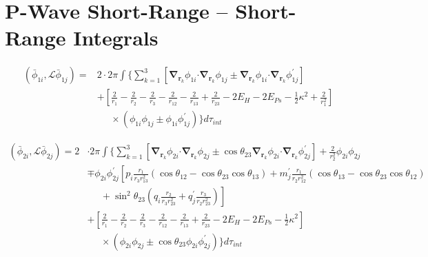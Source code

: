\documentclass[Dissertation.tex]{subfiles}
\begin{document}
\section{P-Wave Short-Range -- Short-Range Integrals}
\label{sec:PWaveShortShort}

\begin{align}
\label{eq:PWavePhi1Phi1}
\left(\bar{\phi}_{1i},\mathcal{L} \bar{\phi}_{1j}\right) = &2 \cdot 2\pi \int{ \Bigg\{ \sum_{k=1}^3 \left[ \boldsymbol{\nabla}_{\!\mathbf{r}_k} \nonumber \phi_{1i} \boldsymbol{\cdot} \boldsymbol{\nabla}_{\!\mathbf{r}_k} \phi_{1j} \pm \boldsymbol{\nabla}_{\!\mathbf{r}_k} \phi_{1i} \boldsymbol{\cdot} \boldsymbol{\nabla}_{\!\mathbf{r}_k} \phi_{1j}^\prime \right] } \\
\nonumber  &+ \left. \left[\frac{2}{r_1} - \frac{2}{r_2} - \frac{2}{r_3} - \frac{2}{r_{12}} - \frac{2}{r_{13}} + \frac{2}{r_{23}} - 2 E_H - 2 E_{Ps} - \frac{1}{2}\kappa^2 + \frac{2}{r_1^2} \right] \right. \\
 &\;\;\;\;\; \times \left(\phi_{1i} \phi_{1j} \pm \phi_{1i} \phi_{1j}^\prime \right) \Bigg\} d\tau_{int}
\end{align}

\begin{align}
\label{eq:PWavePhi2Phi2}
\left(\bar{\phi}_{2i},\mathcal{L} \bar{\phi}_{2j}\right) = 2 & \cdot 2\pi \int \Bigg\{ \sum_{k=1}^3 \left[ \boldsymbol{\nabla}_{\!\mathbf{r}_k} \nonumber \phi_{2i} \boldsymbol{\cdot} \boldsymbol{\nabla}_{\!\mathbf{r}_k} \phi_{2j} \pm \cos\theta_{23} \boldsymbol{\nabla}_{\!\mathbf{r}_k} \phi_{2i} \boldsymbol{\cdot} \boldsymbol{\nabla}_{\!\mathbf{r}_k} \phi_{2j}^\prime \right]  + \frac{2}{r_2^2}\phi_{2i}\phi_{2j} \\
 \nonumber &\mp \phi_{2i} \phi_{2j}^\prime \left[p_i \frac{r_1}{r_3 r_{13}^2} (\cos\theta_{12} - \cos\theta_{23} \cos\theta_{13}) + m_j^\prime \frac{r_1}{r_2 r_{12}^2}(\cos\theta_{13}-\cos\theta_{23} \cos\theta_{12})\right.\\
 \nonumber & \left. \;\;\;\;\;  + \sin^2\theta_{23} \left(q_i \frac{r_2}{r_3 r_{23}^2} + q_j^\prime \frac{r_3}{r_2 r_{23}^2} \right) \right] \\
 \nonumber &+ \left. \left[\frac{2}{r_1} - \frac{2}{r_2} - \frac{2}{r_3} - \frac{2}{r_{12}} - \frac{2}{r_{13}} + \frac{2}{r_{23}} - 2 E_H - 2 E_{Ps} - \frac{1}{2}\kappa^2 \right] \right. \\
 &\;\;\;\;\; \times \left(\phi_{2i} \phi_{2j} \pm \cos\theta_{23} \phi_{2i} \phi_{2j}^\prime \right) \Bigg\} d\tau_{int}
\end{align}
\end{document}
